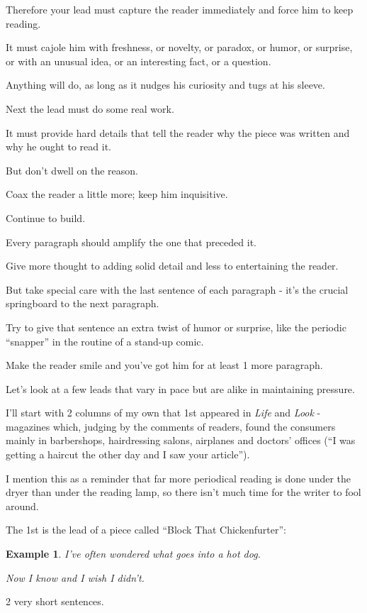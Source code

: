 \documentclass{book}
\numberwithin{equation}{section}
\newtheorem{example}{Example}[chapter]
\begin{document}
%
Therefore your lead must capture the reader immediately and force him to keep reading.

It must cajole him with freshness, or novelty, or paradox, or humor, or surprise, or with an unusual idea, or an interesting fact, or a question.

Anything will do, as long as it nudges his curiosity and tugs at his sleeve.

%
Next the lead must do some real work.

It must provide hard details that tell the reader why the piece was written and why he ought to read it.

But don't dwell on the reason.

Coax the reader a little more; keep him inquisitive.

%
Continue to build.

Every paragraph should amplify the one that preceded it.

Give more thought to adding solid detail and less to entertaining the reader.

But take special care with the last sentence of each paragraph - it's the crucial springboard to the next paragraph.

Try to give that sentence an extra twist of humor or surprise, like the periodic ``snapper'' in the routine of a stand-up comic.

Make the reader smile and you've got him for at least 1 more paragraph.

Let's look at a few leads that vary in pace but are alike in maintaining pressure.

I'll start with 2 columns of my own that 1st appeared in \textit{Life} and \textit{Look} - magazines which, judging by the comments of readers, found the consumers mainly in barbershops, hairdressing salons, airplanes and doctors' offices (``I was getting a haircut the other day and I saw your article'').

I mention this as a reminder that far more periodical reading is done under the dryer than under the reading lamp, so there isn't much time for the writer to fool around.

%
The 1st is the lead of a piece called ``Block That Chickenfurter'':
\begin{example}
    I've often wondered what goes into a hot dog.
    
    Now I know and I wish I didn't.
\end{example}
2 very short sentences.
\end{document}
